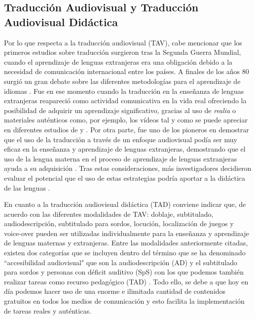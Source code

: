 \documentclass[spanish]{textolivre}
\begin{document}
\subsection{Traducción Audiovisual y Traducción Audiovisual Didáctica}\label{sec-2.1}
Por lo que respecta a la traducción audiovisual (TAV), cabe mencionar que los primeros estudios sobre traducción surgieron tras la Segunda Guerra Mundial, cuando el aprendizaje de lenguas extranjeras era una obligación debido a la necesidad de comunicación internacional entre los países. A finales de los años 80 surgió un gran debate sobre las diferentes metodologías para el aprendizaje de idiomas \cite{danan2010}. Fue en ese momento cuando la traducción en la enseñanza de lenguas extranjeras reapareció como actividad comunicativa en la vida real ofreciendo la posibilidad de adquirir un aprendizaje significativo, gracias al uso de \textit{realia} o materiales auténticos como, por ejemplo, los vídeos tal y como se puede apreciar en diferentes estudios de \textcite{rivers1978} y \textcite{navarro-pablo2019}. Por otra parte, \textcite{vanderplank1988} fue uno de los pioneros en demostrar que el uso de la traducción a través de un enfoque audiovisual podía ser muy eficaz en la enseñanza y aprendizaje de lenguas extranjeras, demostrando que el uso de la lengua materna en el proceso de aprendizaje de lenguas extranjeras ayuda a su adquisición \cite{fraga-castrillon2021, perez-cabello2024}. Tras estas consideraciones, más investigadores decidieron evaluar el potencial que el uso de estas estrategias podría aportar a la didáctica de las lenguas \cite{araujo2008, danan2004, incalcaterra2014, lertola2012, lertola2013, talavan2013, talavan2019, talavan2020, talavan2024, tinedo-rodriguez2023}. 

En cuanto a la traducción audiovisual didáctica (TAD) conviene indicar que, de acuerdo con \textcite{talavan2013} las diferentes modalidades de TAV: doblaje, subtitulado, audiodescripción, subtitulado para sordos, locución, localización de juegos y voice-over \cite{araujo2008, diazcintas2012, rodriguez-arancon2024, fraga-castrillon2024} pueden ser utilizadas individualmente para la enseñanza y aprendizaje de lenguas maternas y extranjeras. Entre las modalidades anteriormente citadas, existen dos categorías que se incluyen dentro del término que se ha denominado ``accesibilidad audiovisual" que son la audiodescripción (AD) y el subtitulado para sordos y personas con déficit auditivo (SpS) con los que podemos también realizar tareas como recurso pedagógico (TAD) \cite{ogea-espejel2024, ogea-talavan2024}. Todo ello, se debe a que hoy en día podemos hacer uso de una enorme e ilimitada cantidad de contenidos gratuitos en todos los medios de comunicación y esto facilita la implementación de tareas reales y auténticas.
\end{document}
